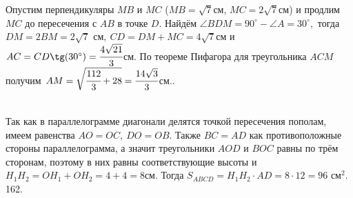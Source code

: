\documentclass[12pt]{article}
\begin{document}
Опустим перпендикуляры $MB$ и $MC$ ($MB=\sqrt{7}$см, $MC=2\sqrt{7}$см) и продлим $MC$ до пересечения с $AB$ в точке $D.$ Найдём $\angle BDM=90^\circ-\angle A=30^\circ,$ тогда $DM=2BM=2\sqrt{7}\text{ см},\ CD=DM+MC=4\sqrt{7}$см и $AC=CD\tg(30^\circ)=\cfrac{4\sqrt{21}}{3}$см. По теореме Пифагора для треугольника $ACM$ получим $AM=\sqrt{\cfrac{112}{3}+28}=\cfrac{14\sqrt{3}}{3}$см.\newpage{}. \begin{figure}[ht!]
\end{figure}\\
Так как в параллелограмме диагонали делятся точкой пересечения пополам, имеем равенства $AO=OC,\ DO=OB.$ Также $BC=AD$ как противоположные стороны параллелограмма, а значит треугольники $AOD$ и $BOC$ равны по трём сторонам, поэтому в них равны соответствующие высоты и $H_1H_2=OH_1+OH_2=4+4=8$см. Тогда $S_{ABCD}=H_1H_2\cdot AD=8\cdot12=96\text{ см}^2.$\\
162. \begin{figure}[ht!]
\end{figure}\\
\end{document}
